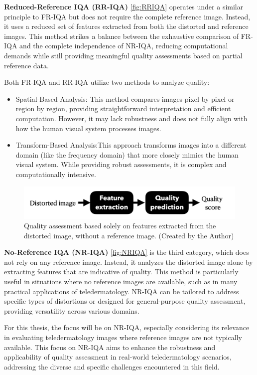 \textbf{Reduced-Reference IQA (RR-IQA)} \autoref{fig:RRIQA} operates under a similar principle to FR-IQA but does not require the complete reference image. Instead, it uses a reduced set of features extracted from both the distorted and reference images. This method strikes a balance between the exhaustive comparison of FR-IQA and the complete independence of NR-IQA, reducing computational demands while still providing meaningful quality assessments based on partial reference data. \par
\vspace{\baselineskip}
Both FR-IQA and RR-IQA utilize two methods to analyze quality:
\begin{itemize}
    \item Spatial-Based Analysis: This method compares images pixel by pixel or region by region, providing straightforward interpretation and efficient computation. However, it may lack robustness and does not fully align with how the human visual system processes images.
    \item Transform-Based Analysis:This approach transforms images into a different domain (like the frequency domain) that more closely mimics the human visual system. While providing robust assessments, it is complex and computationally intensive.
\end{itemize}
\vspace{\baselineskip}
\begin{figure}[ht]
    \centering
    \includegraphics[keepaspectratio,width=15cm]{img/NRIQA.jpg}
    \caption{Quality assessment based solely on features extracted from the distorted image, without a reference image. (Created by the Author)}
    \label{fig:NRIQA}
\end{figure}

\textbf{No-Reference IQA (NR-IQA)} \autoref{fig:NRIQA} is the third category, which does not rely on any reference image. Instead, it analyzes the distorted image alone by extracting features that are indicative of quality. This method is particularly useful in situations where no reference images are available, such as in many practical applications of teledermatology. NR-IQA can be tailored to address specific types of distortions or designed for general-purpose quality assessment, providing versatility across various domains. \par
\vspace{\baselineskip}
For this thesis, the focus will be on NR-IQA, especially considering its relevance in evaluating teledermatology images where reference images are not typically available. This focus on NR-IQA aims to enhance the robustness and applicability of quality assessment in real-world teledermatology scenarios, addressing the diverse and specific challenges encountered in this field.

